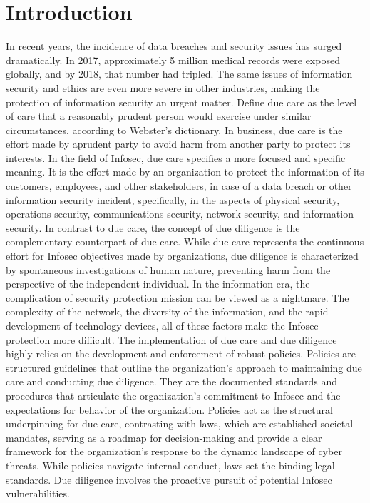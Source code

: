 \documentclass[
10pt, %
a4paper, %
oneside, %
headinclude,footinclude, %
BCOR5mm, %
]{scrartcl}
\begin{document}
\section{Introduction}
In recent years, the incidence of data breaches and security issues has surged dramatically. 
In 2017, approximately 5 million medical records were exposed globally, and by 2018, that number had tripled. 
The same issues of information security and ethics are even more severe in other industries, making the protection of information security an urgent matter.
Define due care as the level of care that a reasonably prudent person would exercise under similar circumstances, according to Webster's dictionary.
In business, due care is the effort made by aprudent party to avoid harm from another party to protect its interests. 
In the field of Infosec, due care specifies a more focused and specific meaning.
It is the effort made by an organization to protect the information of its customers, employees, and other stakeholders, in case of a data breach or other information security incident, 
specifically, in the aspects of physical security, operations security, communications security, network security, and information security.
In contrast to due care, the concept of due diligence is the complementary counterpart of due care.
While due care represents the continuous effort for Infosec objectives made by organizations, due diligence is characterized by spontaneous investigations of human nature, preventing harm from the perspective of the independent individual.
In the information era, the complication of security protection mission can be viewed as a nightmare. The complexity of the network, the diversity of the information, and the rapid development of technology devices, all of these factors make the Infosec protection more difficult.
The implementation of due care and due diligence highly relies on the development and enforcement of robust policies. 
Policies are structured guidelines that outline the organization's approach to maintaining due care and conducting due diligence. 
They are the documented standards and procedures that articulate the organization's commitment to Infosec and the expectations for behavior of the organization. 
Policies act as the structural underpinning for due care, contrasting with laws, which are established societal mandates, serving as a roadmap for decision-making and provide a clear framework for the organization's response to the dynamic landscape of cyber threats.
While policies navigate internal conduct, laws set the binding legal standards. Due diligence involves the proactive pursuit of potential Infosec vulnerabilities. 
\end{document}

